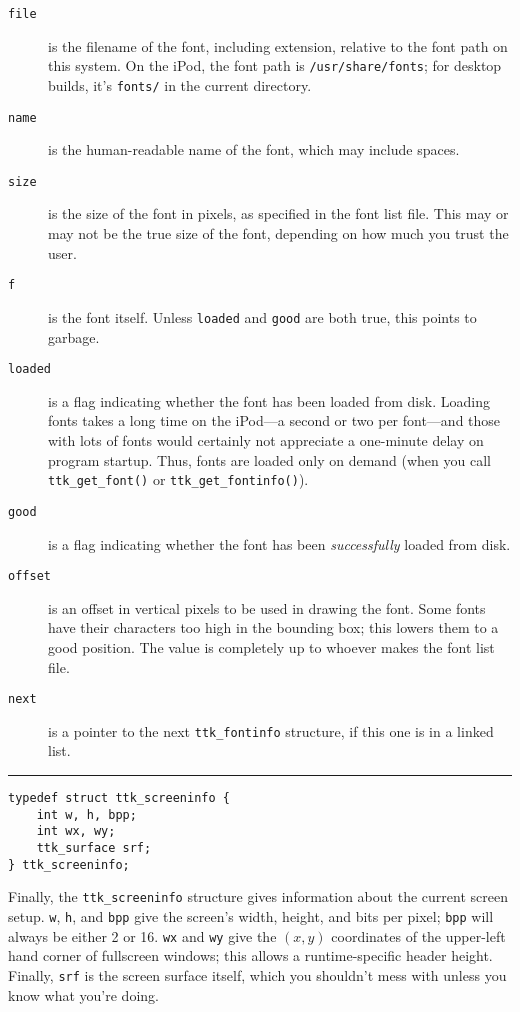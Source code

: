 \documentclass[12pt,letterpaper]{report}
\let\ttt\tt
\def\tt{\def\_{{\ttt\char`\_}}\ttt}
\begin{document}
\vskip6pt\relax
\begin{description}
\item[{\tt file}] is the filename of the font, including extension, relative to the font path
on this system. On the iPod, the font path is \verb|/usr/share/fonts|; for desktop builds, it's
\verb|fonts/| in the current directory.
\item[{\tt name}] is the human-readable name of the font, which may include spaces.
\item[{\tt size}] is the size of the font in pixels, as specified in the font list file. This may or
may not be the true size of the font, depending on how much you trust the user.
\item[{\tt f}] is the font itself. Unless {\tt loaded} and {\tt good} are both true, this points
to garbage.
\item[{\tt loaded}] is a flag indicating whether the font has been loaded from disk. Loading fonts takes
a long time on the iPod---a second or two per font---and those with lots of fonts would certainly
not appreciate a one-minute delay on program startup. Thus, fonts are loaded only on demand (when
you call \verb|ttk_get_font()| or \verb|ttk_get_fontinfo()|).
\item[{\tt good}] is a flag indicating whether the font has been \emph{successfully} loaded from disk.
\item[{\tt offset}] is an offset in vertical pixels to be used in drawing the font. Some fonts have their
characters too high in the bounding box; this lowers them to a good position. The value is completely
up to whoever makes the font list file.
\item[{\tt next}] is a pointer to the next \verb|ttk_fontinfo| structure, if this one is in a linked list.
\end{description}

\hrule

\begin{verbatim}
typedef struct ttk_screeninfo {
    int w, h, bpp;
    int wx, wy;
    ttk_surface srf;
} ttk_screeninfo;
\end{verbatim}

Finally, the \verb|ttk_screeninfo| structure gives information about the current screen setup.
\verb|w|, \verb|h|, and \verb|bpp| give the screen's width, height, and bits per pixel; \verb|bpp|
will always be either 2 or 16. \verb|wx| and \verb|wy| give the $(x,y)$ coordinates of the
upper-left hand corner of fullscreen windows; this allows a runtime-specific header height.
Finally, \verb|srf| is the screen surface itself, which you shouldn't mess with unless you know
what you're doing.
\end{document}
